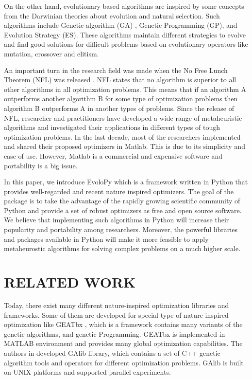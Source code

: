 \documentclass[a4paper,twoside]{article}
\begin{document}
On the other hand, evolutionary based algorithms are inspired by some concepts from the Darwinian theories about evolution and natural selection. Such algorithms include Genetic algorithm (GA) \cite{Holland92}, Genetic Programming (GP)\cite{Koza1992}, and Evolution Strategy (ES)\cite{Beyer2002}. These algorithms maintain different strategies to evolve and find good solutions for difficult problems based on evolutionary operators like mutation, crossover and elitism. 

An important turn in the research field was made when the No Free Lunch Theorem (NFL) was released \cite{wolpert1997no,ho2002simple}. NFL states that no algorithm is superior to all other algorithms in all optimization problems. This means that if an algorithm A outperforms another algorithm B for some type of optimization problems then algorithm B outperforms A in another types of problems. Since the release of NFL, researcher and practitioners have developed a wide range of metaheuristic algorithms and investigated their applications in different types of tough optimization problems. In the last decade, most of the researchers implemented and shared their proposed optimizers in Matlab. This is due to its simplicity and ease of use. However, Matlab is a commercial and expensive software and portability is a big issue.

In this paper, we introduce EvoloPy which is a framework written in Python that provides well-regarded and recent nature inspired optimizers. The goal of the package is to take the advantage of the rapidly growing scientific community of Python and provide a set of robust optimizers as free and open source software. We believe that implementing such algorithms in Python will increase their popularity and portability among researchers. Moreover, the powerful libraries and packages available in Python will make it more feasible to apply metaheurostic algorithms for solving complex problems on a much higher scale.



\section{\uppercase{Related Work}}
Today, there exist many different nature-inspired optimization libraries and frameworks. Some of them are developed for special type of nature-inspired optimization like GEATbx \cite{GEATbx}, which is a framework contains many variants of the genetic algorithms, and genetic Programming. GEATbx is implemented in MATLAB environment and provides many global optimization capabilities. The authors in \cite {GAlib} developed GAlib library, which contains a set of C++ genetic algorithm tools and operators for different optimization problems. GAlib is built on UNIX platforms and supported parallel experiments. 
\end{document}
